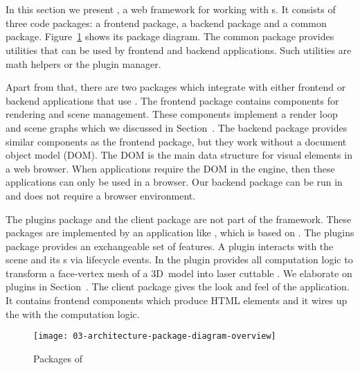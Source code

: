 \documentclass[../../ClassicThesis.tex]{subfiles}
\begin{document}

\section{{\convertify}}
\label{sec:framework-convertify}

In this section we present {\convertify}, a web framework
for working with {\threedmodel}s. It consists of three code
packages: a frontend package, a backend package and a common
package. Figure~\ref{fig:platener-package-diagram-overview}
shows its package diagram. The common package provides
utilities that can be used by frontend and backend
applications. Such utilities are math helpers or the plugin
manager.

Apart from that, there are two packages which
integrate with either frontend or backend applications that
use {\convertify}. The frontend package contains components
for rendering and scene management. These components
implement a render loop and scene graphs which we discussed
in Section~. The backend package provides
similar components as the frontend package, but they work
without a document object model (DOM). The DOM is the main
data structure for visual elements in a web browser. When
applications require the DOM in the {\javascript} engine,
then these applications can only be used in a browser. Our
backend package can be run in {\nodejs} and does not require a
browser environment.

The plugins package and the client package are not part of
the {\convertify} framework. These packages are implemented
by an application like {\platener}, which is based on
{\convertify}. The plugins package provides an exchangeable
set of features. A plugin interacts with the scene and its
{\threedmodel}s via lifecycle events. In {\platener} the
 plugin provides all computation
logic to transform a face-vertex mesh of a 3D~model into
laser cuttable {\svgfile}. We elaborate on plugins in
Section~. The client package gives
the look and feel of the application. It contains frontend
components which produce HTML elements and it wires up the
{\userinterface} with the computation logic.

\begin{figure}[h]
  \centering
  \texttt{[image: 03-architecture-package-diagram-overview]}
  \caption{Packages of {\convertify}}
  \label{fig:platener-package-diagram-overview}
\end{figure}
\end{document}
